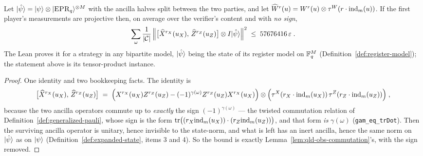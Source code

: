 \begin{lemma}
\label{lem:qld-expanded-commutation}
\leanok
Let $|\hat\psi\rangle = |\psi\rangle \otimes |\textsc{EPR}_q\rangle^{\otimes M}$ with the ancilla halves split between
the two parties, and let
$\widehat{W}^{r}(u) = W^{r}(u) \otimes \tau^W(r \cdot \mathrm{ind}_m(u))$. If the first player's measurements
are projective then, on average over the verifier's content and with \emph{no sign},
\begin{equation*}
  \sum_\omega \frac{1}{\left\vert {\ensuremath{\mathcal{C}}} \right\vert}
    \left\| {\bigl[ \widehat{X}^{r_X}(u_X),\, \widehat{Z}^{r_Z}(u_Z) \bigr]
      \otimes I |\hat\psi\rangle} \right\|^2 \;\leq\; 57676416\, \varepsilon\;.
\end{equation*}
The Lean proves it for a strategy in any bipartite model, $|\hat\psi\rangle$ being the state of its
register model on $\mathbb{F}_q^M$ (Definition~\ref{def:register-model}); the statement above is its
tensor-product instance.
\end{lemma}

\begin{proof}
\leanok
{}
One identity and two bookkeeping facts. The identity is
\begin{equation*}
  \bigl[ \widehat{X}^{r_X}(u_X),\, \widehat{Z}^{r_Z}(u_Z) \bigr]
  \;=\; \Bigl( X^{r_X}(u_X) Z^{r_Z}(u_Z) - (-1)^{\gamma(\omega)} Z^{r_Z}(u_Z) X^{r_X}(u_X) \Bigr)
    \otimes \Bigl( \tau^X(r_X \cdot \mathrm{ind}_m(u_X))\, \tau^Z(r_Z \cdot \mathrm{ind}_m(u_Z)) \Bigr)\;,
\end{equation*}
because the two ancilla operators commute up to \emph{exactly} the sign $(-1)^{\gamma(\omega)}$ ---
the twisted commutation relation of Definition~\ref{def:generalized-pauli}, whose sign is the form
$\operatorname{tr}\bigl( (r_X \mathrm{ind}_m(u_X)) \cdot (r_Z \mathrm{ind}_m(u_Z)) \bigr)$, and that form \emph{is}
$\gamma(\omega)$ (\texttt{gam\_eq\_trDot}). Then the surviving ancilla operator is unitary, hence
invisible to the state-norm, and what is left has an inert ancilla, hence the same norm on
$|\hat\psi\rangle$ as on $|\psi\rangle$ (Definition~\ref{def:expanded-state}, items 3 and 4). So the
bound is exactly Lemma~\ref{lem:qld-obs-commutation}'s, with the sign removed.
\end{proof}

